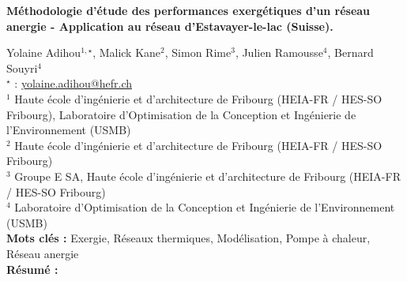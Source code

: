 


    \newpage


%
\begin{flushleft}
\addtocounter{section}{1}
{\Large \textbf{Méthodologie d'étude des performances exergétiques d'un réseau anergie - Application au réseau d'Estavayer-le-lac (Suisse).}}\label{ref:27}
\end{flushleft}
%
Yolaine Adihou$^{1,\star}$, Malick Kane$^{2}$, Simon Rime$^{3}$, Julien Ramousse$^{4}$, Bernard Souyri$^{4}$\\[2mm]
$^{\star}$ \Letter : \url{yolaine.adihou@hefr.ch}\\[2mm]
{\footnotesize $^{1}$ Haute école d'ingénierie et d'architecture de Fribourg  (HEIA-FR / HES-SO Fribourg), Laboratoire d'Optimisation de la Conception et Ingénierie de l'Environnement (USMB)}\\
{\footnotesize $^{2}$ Haute école d'ingénierie et d'architecture de Fribourg  (HEIA-FR / HES-SO Fribourg)}\\
{\footnotesize $^{3}$ Groupe E SA, Haute école d'ingénierie et d'architecture de Fribourg  (HEIA-FR / HES-SO Fribourg)}\\
{\footnotesize $^{4}$ Laboratoire d'Optimisation de la Conception et Ingénierie de l'Environnement (USMB)}\\
[4mm]
%
\noindent \textbf{Mots clés : } Exergie, Réseaux thermiques, Modélisation, Pompe à chaleur, Réseau anergie\\[4mm]
%
\noindent \textbf{Résumé : } 

